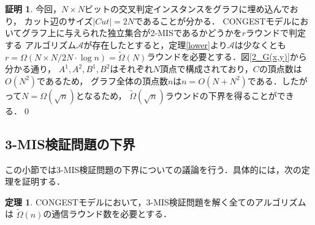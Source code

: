 \documentclass[11pt,a4paper]{jarticle}
\newcommand{\CONGEST}{\textsf{CONGEST}}
\theoremstyle{definition}
\newtheorem{theorem}{定理}[section]
\newtheorem*{prf*}{証明}
\begin{document}
\begin{prf*}
今回，$N \times N$ビットの交叉判定インスタンスをグラフに埋め込んでおり，
カット辺のサイズ$|\mathit{Cut}| = 2N$であることが分かる．
{\CONGEST}モデルにおいてグラフ上に与えられた独立集合が2-MISであるかどうかを$r$ラウンドで判定する
アルゴリズム$\mathcal{A}$が存在したとすると，定理\ref{lower}より$\mathcal{A}$は少なくとも
$r = \Omega (N \times N/ 2N \cdot \log n) = \tilde{\Omega}(N)$ラウンドを必要とする．図\ref{2_G(x,y)}から分かる通り，
$A^{1}, A^{2}, B^{1}, B^{2}$はそれぞれ$N$頂点で構成されており，$C$の頂点数は$O(N^{2})$であるため，
グラフ全体の頂点数$n$は$n = O(N + N^{2})$である．したがって$N = \Omega(\sqrt{n})$となるため，
$\tilde{\Omega}(\sqrt{n})$ラウンドの下界を得ることができる．\qed
\end{prf*}
\newpage

\subsection{3-MIS検証問題の下界}
この小節では3-MIS検証問題の下界についての議論を行う．具体的には，次の定理を証明する．
\begin{theorem}
{\CONGEST}モデルにおいて，3-MIS検証問題を解く全てのアルゴリズムは
$\tilde{\Omega} (n)$の通信ラウンド数を必要とする．
\end{theorem}
\end{document}
